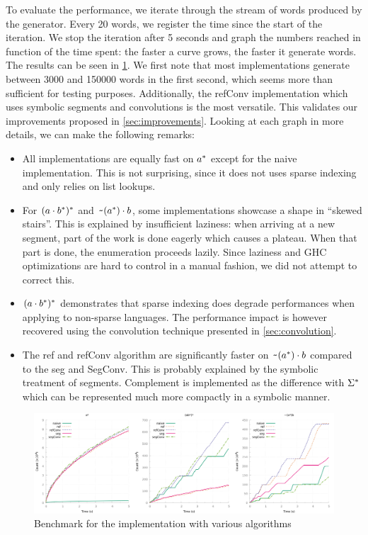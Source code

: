 
To evaluate the performance, we iterate through the stream of words produced by
the generator. Every 20 words, we register the time since the start of the
iteration. We stop the iteration after 5 seconds and graph the numbers reached in
function of the time spent: the faster a curve grows, the faster it generate
words.
The results can be seen in \cref{bench:haskell:all}.
We first note that most implementations generate between 3000 and
150000 words in the first second, which seems more than sufficient for testing
purposes.
Additionally, the refConv implementation
which uses symbolic segments and convolutions
is the most versatile. This validates our improvements
proposed in \cref{sec:improvements}.
Looking at each graph in more details, we can make the following remarks:
\begin{itemize}[leftmargin=*]
\item All implementations are equally fast on $a^*$ except
for the naive implementation. This is not surprising, since it does not uses
sparse indexing and only relies on list lookups.
\item 
For $(a \cdot{b^*})^*$ and
$\texttt{\textasciitilde}{(a^*)} \cdot{b}$, some implementations showcase
a shape in ``skewed stairs''. This is explained by insufficient laziness:
when arriving at a new segment, part of the work is done eagerly which causes
a plateau. When that part is done, the enumeration proceeds lazily.
Since laziness and GHC optimizations are hard to control in a manual fashion,
we did not attempt to correct this.
\item $(a \cdot{b^*})^*$ demonstrates that sparse indexing
  does degrade performances when applying  to non-sparse languages.
  The performance impact is however recovered using the convolution technique
  presented in \cref{sec:convolution}.
\item The ref and refConv algorithm are significantly faster
  on $\texttt{\textasciitilde}{(a^*)} \cdot{b}$ compared to the
  seg and SegConv. This is probably explained by
  the symbolic treatment of segments. Complement is implemented
  as the difference with $\Sigma^*$ which can be represented much more
  compactly in a symbolic manner.
\end{itemize}

\begin{figure}[h]
  \centering
  \includegraphics[height=0.33\linewidth]{measure/haskell_all.png}
  \caption{Benchmark for the \haskell implementation with various algorithms}
  \label{bench:haskell:all}
\end{figure}


